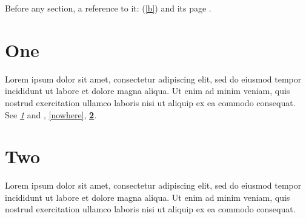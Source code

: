 \documentclass[12pt]{article}
\begin{document}
Before any section\label{b}, a reference to it: (\ref{b}) and its page \pageref{b}.
\section{One}\label{one}
Lorem ipsum dolor sit amet, consectetur adipiscing elit, sed do eiusmod tempor incididunt ut labore et dolore magna aliqua. Ut enim ad minim veniam, quis nostrud exercitation ullamco laboris nisi ut aliquip ex ea commodo consequat. See \emph{\ref{one}} and \textit{\pageref{two}}, \ref{nowhere}, \textbf{\ref{two}}.

\section{Two}\label{two}
Lorem ipsum dolor sit amet, consectetur adipiscing elit, sed do eiusmod tempor incididunt ut labore et dolore magna aliqua. Ut enim ad minim veniam, quis nostrud exercitation ullamco laboris nisi ut aliquip ex ea commodo consequat.
\end{document}
